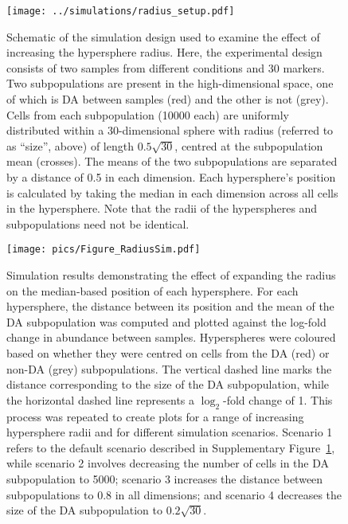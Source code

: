 \documentclass{article}
\begin{document}
\begin{figure}[tbp]
    \begin{center}
        \texttt{[image: ../simulations/radius\_setup.pdf]}
    \end{center}
    \caption{Schematic of the simulation design used to examine the effect of increasing the hypersphere radius.
        Here, the experimental design consists of two samples from different conditions and 30 markers.
        Two subpopulations are present in the high-dimensional space, one of which is DA between samples (red) and the other is not (grey).
        Cells from each subpopulation (10000 each) are uniformly distributed within a 30-dimensional sphere with radius (referred to as ``size'', above) of length $0.5\sqrt{30}$, centred at the subpopulation mean (crosses).
        The means of the two subpopulations are separated by a distance of 0.5 in each dimension.
        Each hypersphere's position is calculated by taking the median in each dimension across all cells in the hypersphere.
        Note that the radii of the hyperspheres and subpopulations need not be identical.
    }
    \label{fig:radius_schematic}
\end{figure}

\begin{figure}[tbp]
    \begin{center}
        \texttt{[image: pics/Figure\_RadiusSim.pdf]}
    \end{center}
    \caption{Simulation results demonstrating the effect of expanding the radius on the median-based position of each hypersphere.
        For each hypersphere, the distance between its position and the mean of the DA subpopulation was computed and plotted against the log-fold change in abundance between samples.
        Hyperspheres were coloured based on whether they were centred on cells from the DA (red) or non-DA (grey) subpopulations.
        The vertical dashed line marks the distance corresponding to the size of the DA subpopulation, while the horizontal dashed line represents a $\log_2$-fold change of 1.
        This process was repeated to create plots for a range of increasing hypersphere radii and for different simulation scenarios.
        Scenario 1 refers to the default scenario described in Supplementary Figure~\ref{fig:radius_schematic}, while scenario 2 involves decreasing the number of cells in the DA subpopulation to 5000; scenario 3 increases the distance between subpopulations to 0.8 in all dimensions; and scenario 4 decreases the size of the DA subpopulation to $0.2\sqrt{30}$.
    }
    \label{fig:radius_position}
\end{figure}
\end{document}
